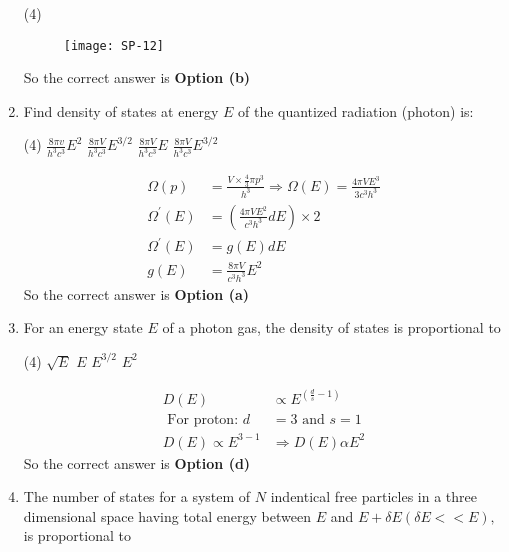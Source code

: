 \begin{enumerate}
\begin{tasks}(4)
\end{tasks}
\begin{answer}
	\begin{figure}[H]
		\centering
		\texttt{[image: SP-12]}
	\end{figure}
	So the correct answer is \textbf{Option (b)}
\end{answer}
\item  Find density of states at energy $E$ of the quantized radiation (photon) is:
\begin{tasks}(4)
	\task[\textbf{a.}]$\frac{8 \pi v}{h^{3} c^{3}} E^{2}$
	\task[\textbf{b.}]$\frac{8 \pi V}{h^{3} c^{3}} E^{3 / 2}$
	\task[\textbf{c.}]$\frac{8 \pi V}{h^{3} c^{3}} E$
	\task[\textbf{d.}] $\frac{8 \pi V}{h^{3} c^{3}} E^{3 / 2}$
\end{tasks}
\begin{answer}
	\begin{align*}
	\Omega(p)&=\frac{V \times \frac{4}{3} \pi p^{3}}{h^{3}} \Rightarrow \Omega(E)=\frac{4 \pi V E^{3}}{3 c^{3} h^{3}}\\
	\Omega^{\prime}(E)&=\left(\frac{4 \pi V E^{2}}{c^{3} h^{3}} d E\right) \times 2\\
	\Omega^{\prime}(E)&=g(E) d E\\
	g(E)&=\frac{8 \pi V}{c^{3} h^{3}} E^{2}
	\end{align*}
	So the correct answer is \textbf{Option (a)}
\end{answer}
\item 
For an energy state $E$ of a photon gas, the density of states is proportional to 
\begin{tasks}(4)
	\task[\textbf{a.}] $\sqrt{E}$
	\task[\textbf{b.}] $E $
	\task[\textbf{c.}]$E^{3 / 2}$
	\task[\textbf{d.}] $E^{2}$
\end{tasks}
\begin{answer}
	\begin{align*}
	D(E) &\propto E^{\left(\frac{d}{s}-1\right)}\\
	\text { For proton: } d&=3 \text { and } s=1\\
	D(E) \propto E^{3-1} &\Rightarrow D(E) \alpha E^{2}
	\end{align*}
	So the correct answer is \textbf{Option (d)}
\end{answer}
\item 
The number of states for a system of $N$ indentical free particles in a three dimensional space having total energy between $E$ and $E+\delta E(\delta E<<E),$ is proportional to 

\end{enumerate}
